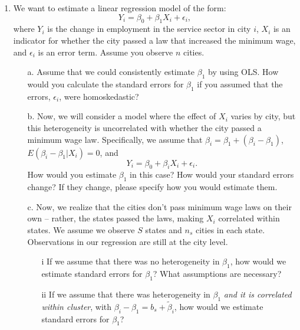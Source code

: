 \documentclass[11pt, a4paper]{article}
\begin{document}
\begin{enumerate}
   \item We want to estimate a linear regression model of the form:
    \begin{equation}
        Y_{i} = \beta_{0} + \beta_{1}X_{i} + \epsilon_{i},
    \end{equation}
    where $Y_{i}$ is the change in employment in the service sector in city $i$, $X_{i}$ is an indicator for whether the city passed a law that increased the minimum wage, and $\epsilon_{i}$ is an error term. Assume you observe $n$ cities. 
    
    \begin{enumerate}
        \item[a.] Assume that we could consistently estimate $\beta_{1}$ by using OLS. How would you calculate the standard errors for $\beta_{1}$ if you assumed that the errors, $\epsilon_{i}$, were homoskedastic?
        \item[b.] Now, we will consider a model where the effect of $X_{i}$ varies by city, but this heterogeneity is uncorrelated with whether the city passed a minimum wage law. Specifically, we assume that $\beta_{i} = \beta_{1} + (\beta_{i} - \beta_{1})$, $E(\beta_{i} - \beta_{1} | X_{i}) = 0$, and 
        \begin{equation}
            Y_{i} = \beta_{0} + \beta_{i}X_{i} + \epsilon_{i}.
        \end{equation}
        How would you estimate $\beta_{1}$ in this case? How would your standard errors change? If they change, please specify how you would estimate them.
        \item[c.] Now, we realize that the cities don't pass minimum wage laws on their own -- rather, the states passed the laws, making $X_{i}$ correlated within states. We assume we observe $S$ states and $n_{s}$ cities in each state. Observations in our regression are still at the city level.
        \begin{enumerate}
            \item[i] If we assume that there was no heterogeneity in $\beta_{1}$, how would we estimate standard errors for $\beta_{1}$? What assumptions are necessary?
            \item[ii] If we assume that there was heterogeneity in $\beta_{1}$ \emph{and it is correlated within cluster}, with $\beta_{i} - \beta_{1} = b_{s} + \tilde{\beta}_{i}$, how would we estimate standard errors for $\beta_{1}$? 
        \end{enumerate}
    \end{enumerate}
    

\end{enumerate}
\end{document}
